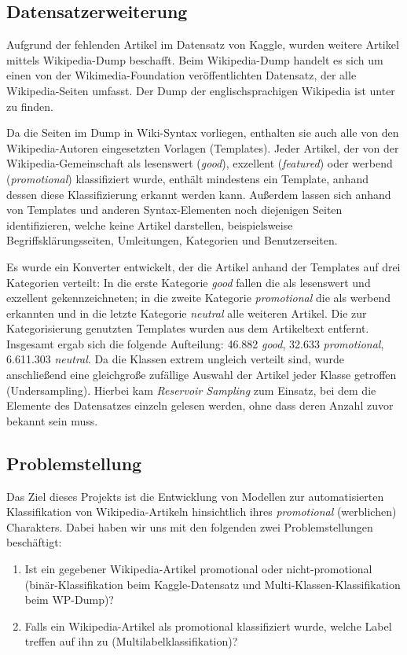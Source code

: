 \subsection{Datensatzerweiterung}
\label{ProblemeDatensatz}
\label{WPDump}
Aufgrund der fehlenden Artikel im Datensatz von Kaggle, wurden weitere Artikel mittels Wikipedia-Dump beschafft. Beim Wikipedia-Dump handelt es sich um einen von der Wikimedia-Foundation veröffentlichten Datensatz, der alle Wikipedia-Seiten umfasst. Der Dump der englischsprachigen Wikipedia ist unter \cite{WpDump2024} zu finden.

Da die Seiten im Dump in Wiki-Syntax vorliegen, enthalten sie auch alle von den Wikipedia-Autoren eingesetzten Vorlagen (Templates). Jeder Artikel, der von der Wiki\-pedia-Gemeinschaft als lesenswert (\emph{good}), exzellent (\emph{featured}) oder werbend (\emph{promotional}) klassifiziert wurde, enthält mindestens ein Template, anhand dessen diese Klassifizierung erkannt werden kann. Außerdem lassen sich anhand von Templates und anderen Syntax-Elementen noch diejenigen Seiten identifizieren, welche keine Artikel darstellen, beispielsweise Begriffsklärungsseiten, Umleitungen, Kategorien und Benutzerseiten.

Es wurde ein Konverter entwickelt, der die Artikel anhand der Templates auf drei Kategorien verteilt: In die erste Kategorie \emph{good} fallen die als lesenswert und exzellent gekennzeichneten; in die zweite Kategorie \emph{promotional} die als werbend erkannten und in die letzte Kategorie \emph{neutral} alle weiteren Artikel. Die zur Kategorisierung genutzten Templates wurden aus dem Artikeltext entfernt. Insgesamt ergab sich die folgende Aufteilung: 46.882 \emph{good}, 32.633 \emph{promotional}, 6.611.303 \emph{neutral}. Da die Klassen extrem ungleich verteilt sind, wurde anschließend eine gleichgroße zufällige Auswahl der Artikel jeder Klasse getroffen (Undersampling). Hierbei kam \textit{Reservoir Sampling} \cite{Vitter1985} zum Einsatz, bei dem die Elemente des Datensatzes einzeln gelesen werden, ohne dass deren Anzahl zuvor bekannt sein muss.

\subsection{Problemstellung}
\label{Problemdefinition}
Das Ziel dieses Projekts ist die Entwicklung von Modellen zur automatisierten Klassifikation von Wikipedia-Artikeln hinsichtlich ihres \textit{promotional} (werblichen) Charakters. Dabei haben wir uns mit den folgenden zwei Problemstellungen beschäftigt:
\begin{enumerate}
    \item Ist ein gegebener Wikipedia-Artikel promotional oder nicht-promotional (binär-Klassifikation beim Kaggle-Datensatz und Multi-Klassen-Klassifikation beim WP-Dump)?

    \item Falls ein Wikipedia-Artikel als promotional klassifiziert wurde, welche Label treffen auf ihn zu (Multilabelklassifikation)?
\end{enumerate}
